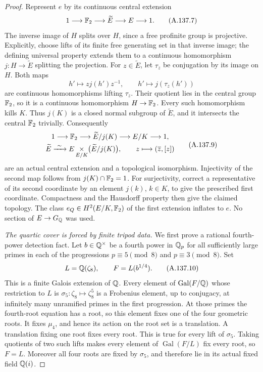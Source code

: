 \begin{proof}
Represent \(e\) by its continuous central extension
\[
               1\longrightarrow\mathbb F_2\longrightarrow
                  \widetilde E\longrightarrow E\longrightarrow1.
\tag{A.137.7}
\]
The inverse image of \(H\) splits over \(H\), since
a free profinite group is projective.  Explicitly,
choose lifts of its finite free generating set in
that inverse image; the defining universal property
extends them to a continuous homomorphism
\(j:H\to\widetilde E\) splitting the projection.
For \(z\in\widetilde E\), let \(\tau_z\) be conjugation
by its image on \(H\).  Both maps
\[
 h'\longmapsto zj(h')z^{-1},\qquad
 h'\longmapsto j(\tau_z(h'))
\tag{A.137.8}
\]
are continuous homomorphisms lifting \(\tau_z\).
Their quotient lies in the central group \(\mathbb F_2\),
so it is a continuous homomorphism \(H\to\mathbb F_2\).
Every such homomorphism kills \(K\).
Thus \(j(K)\) is a closed normal subgroup of
\(\widetilde E\), and it intersects the central
\(\mathbb F_2\) trivially.
Consequently
\[
 \begin{gathered}
 1\longrightarrow\mathbb F_2\longrightarrow
       \widetilde E/j(K)\longrightarrow E/K\longrightarrow1,\\
 \widetilde E\xrightarrow{\ \sim\ }
       E\mathop{\times}_{E/K}\bigl(\widetilde E/j(K)\bigr),
       \qquad z\longmapsto(\overline z,[z])
 \end{gathered}
\tag{A.137.9}
\]
are an actual central extension and a topological
isomorphism.  Injectivity of the second map follows
from \(j(K)\cap\mathbb F_2=1\).  For surjectivity, correct a
representative of its second coordinate by an element
\(j(k)\), \(k\in K\), to give the prescribed first
coordinate.  Compactness and the Hausdorff property
then give the claimed topology.
The class \(e_Q\in H^2(E/K,\mathbb F_2)\) of the first
extension inflates to \(e\).
No section of \(E\to G_\mathbb Q\) was used.

\emph{The quartic cover is forced by finite tripod data.}
We first prove a rational fourth-power detection fact.
Let \(b\in\mathbb Q^\times\) be a fourth power in \(\mathbb Q_p\)
for all sufficiently large primes in each of the
progressions \(p\equiv5\pmod8\) and
\(p\equiv3\pmod8\).
Set
\[
                L=\mathbb Q(\zeta_8),\qquad F=L(b^{1/4}).
\tag{A.137.10}
\]
This is a finite Galois extension of \(\mathbb Q\).
Every element of \(\operatorname{Gal}(F/\mathbb Q)\) whose
restriction to \(L\) is \(\sigma_5:\zeta_8\mapsto\zeta_8^5\)
is a Frobenius element, up to conjugacy, at infinitely
many unramified primes in the first progression.
At those primes the fourth-root equation has a root,
so this element fixes one of the four geometric roots.
It fixes \(\mu_4\), and hence its action on the root
set is a translation.  A translation fixing one root
fixes every root.
This is true for every lift of \(\sigma_5\).
Taking quotients of two such lifts makes every element
of \(\operatorname{Gal}(F/L)\) fix every root, so
\(F=L\).  Moreover all four roots are fixed by
\(\sigma_5\), and therefore lie in its actual fixed
field \(\mathbb Q(i)\).


\end{proof}
